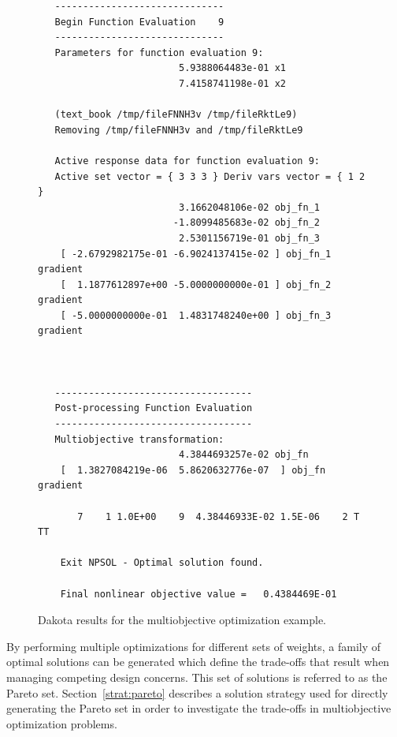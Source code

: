 \begin{figure}
\centering
\begin{bigbox}
\begin{small}
\begin{verbatim}
   ------------------------------
   Begin Function Evaluation    9
   ------------------------------
   Parameters for function evaluation 9:
                         5.9388064483e-01 x1
                         7.4158741198e-01 x2

   (text_book /tmp/fileFNNH3v /tmp/fileRktLe9)
   Removing /tmp/fileFNNH3v and /tmp/fileRktLe9

   Active response data for function evaluation 9:
   Active set vector = { 3 3 3 } Deriv vars vector = { 1 2 }
                         3.1662048106e-02 obj_fn_1
                        -1.8099485683e-02 obj_fn_2
                         2.5301156719e-01 obj_fn_3
    [ -2.6792982175e-01 -6.9024137415e-02 ] obj_fn_1 gradient
    [  1.1877612897e+00 -5.0000000000e-01 ] obj_fn_2 gradient
    [ -5.0000000000e-01  1.4831748240e+00 ] obj_fn_3 gradient



   -----------------------------------
   Post-processing Function Evaluation
   -----------------------------------
   Multiobjective transformation:
                         4.3844693257e-02 obj_fn
    [  1.3827084219e-06  5.8620632776e-07  ] obj_fn gradient

       7    1 1.0E+00    9  4.38446933E-02 1.5E-06    2 T TT     

    Exit NPSOL - Optimal solution found.

    Final nonlinear objective value =   0.4384469E-01
\end{verbatim}
\end{small}
\end{bigbox}
\caption{Dakota results for the multiobjective optimization example.}
\label{opt:figure02}
\end{figure}

By performing multiple optimizations for different sets of weights, a
family of optimal solutions can be generated which define the
trade-offs that result when managing competing design concerns. This
set of solutions is referred to as the Pareto set.
Section~\ref{strat:pareto} describes a solution strategy used for
directly generating the Pareto set in order to investigate the
trade-offs in multiobjective optimization problems.


